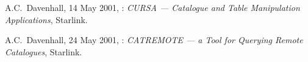 \documentclass[twoside,11pt,nolof]{starlink}
\begin{document}

\begin{thebibliography}{99}

   A.C.~Davenhall, 14 May 2001,
   : \textit{CURSA --- Catalogue and Table
    Manipulation Applications}, Starlink.

   A.C.~Davenhall, 24 May 2001,
   : \textit{CATREMOTE --- a Tool for Querying Remote
   Catalogues}, Starlink.

\end{thebibliography}

\typeout{  }
\typeout{*****************************************************}
\typeout{  }
\typeout{  }
\typeout{*****************************************************}
\typeout{  }
\end{document}
